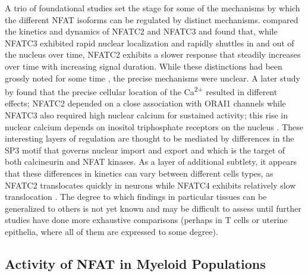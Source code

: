 A trio of foundational studies set the stage for some of the mechanisms by which the different NFAT isoforms can be regulated by distinct mechanisms. \citet{Yissachar2013} compared the kinetics and dynamics of NFATC2 and NFATC3 and found that, while NFATC3 exhibited rapid nuclear localization and rapidly shuttles in and out of the nucleus over time, NFATC2 exhibits a slower response that steadily increases over time with increasing signal duration. While these distinctions had been grossly noted for some time \citep{Chow1997, Rinne2009}, the precise mechanisms were unclear. A later study by \citet{Kar2015} found that the precise cellular location of the Ca\textsuperscript{2+} resulted in different effects; NFATC2 depended on a close association with ORAI1 channels while NFATC3 also required high nuclear calcium for sustained activity; this rise in nuclear calcium depends on inositol triphosphate receptors on the nucleus \citep{Kar2016}. These interesting layers of regulation are thought to be mediated by differences in the SP3 motif that governs nuclear import and export and which is the target of both calcineurin and NFAT kinases. As a layer of additional subtlety, it appears that these differences in kinetics can vary between different cells types, as NFATC2 translocates quickly in neurons while NFATC4 exhibits relatively slow translocation \citep{Vihma2016}. The degree to which findings in particular tissues can be generalized to others is not yet known and may be difficult to assess until further studies have done more exhaustive comparisons (perhaps in T cells or uterine epithelia, where all of them are expressed to some degree). 

\subsection{Activity of NFAT in Myeloid Populations}\label{myeloidnfat}

